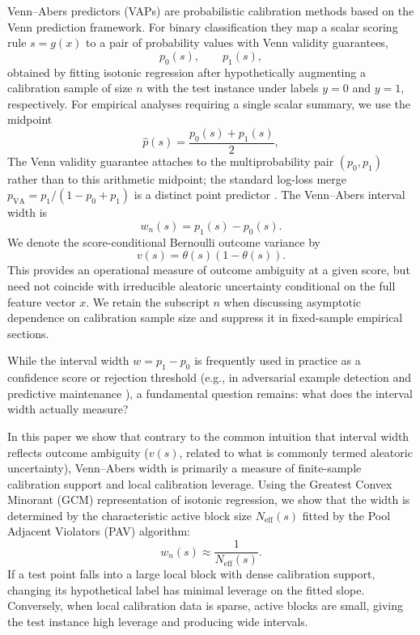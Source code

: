 \documentclass[11pt]{article}
\begin{document}
	Venn--Abers predictors (VAPs) \cite{vovk2014, vovk2015} are probabilistic calibration methods based on the Venn prediction framework. For binary classification they map a scalar scoring rule $s = g(x)$ to a pair of probability values with Venn validity guarantees,
	\begin{equation}
		p_0(s),\qquad p_1(s),
		\label{eq:p0_p1}
	\end{equation}
	obtained by fitting isotonic regression after hypothetically augmenting a calibration sample of size $n$ with the test instance under labels $y=0$ and $y=1$, respectively. For empirical analyses requiring a single scalar summary, we use the midpoint
	\begin{equation}
		\hat p(s)=\frac{p_0(s)+p_1(s)}{2},
		\label{eq:phat_def}
	\end{equation}
	The Venn validity guarantee attaches to the multiprobability pair $(p_0,p_1)$ rather than to this arithmetic midpoint; the standard log-loss merge $p_{\mathrm{VA}}=p_1/(1-p_0+p_1)$ is a distinct point predictor \cite{vovk2015}. The Venn--Abers interval width is
	\begin{equation}
		w_n(s)=p_1(s)-p_0(s).
		\label{eq:wn_def}
	\end{equation}
	We denote the score-conditional Bernoulli outcome variance by
	\begin{equation}
		v(s)=\theta(s)(1-\theta(s)).
		\label{eq:vs_def}
	\end{equation}
	This provides an operational measure of outcome ambiguity at a given score, but need not coincide with irreducible aleatoric uncertainty conditional on the full feature vector $x$. We retain the subscript $n$ when discussing asymptotic dependence on calibration sample size and suppress it in fixed-sample empirical sections.

	While the interval width $w=p_1-p_0$ is frequently used in practice as a confidence score or rejection threshold (e.g., in adversarial example detection \cite{peck2019} and predictive maintenance \cite{johansson2023}), a fundamental question remains: what does the interval width actually measure?

	In this paper we show that contrary to the common intuition that interval width reflects outcome ambiguity ($v(s)$, related to what is commonly termed aleatoric uncertainty), Venn--Abers width is primarily a measure of finite-sample calibration support and local calibration leverage. Using the Greatest Convex Minorant (GCM) representation of isotonic regression, we show that the width is determined by the characteristic active block size $N_{\mathrm{eff}}(s)$ fitted by the Pool Adjacent Violators (PAV) algorithm:
	\begin{equation}
		w_n(s) \approx \frac{1}{N_{\mathrm{eff}}(s)}.
		\label{eq:width_approx_block}
	\end{equation}
	If a test point falls into a large local block with dense calibration support, changing its hypothetical label has minimal leverage on the fitted slope. Conversely, when local calibration data is sparse, active blocks are small, giving the test instance high leverage and producing wide intervals.
\end{document}
